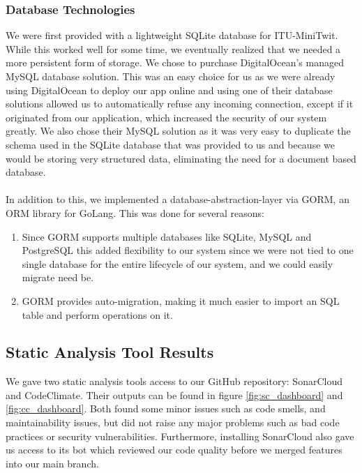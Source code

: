 \documentclass{article}
\begin{document}
\subsubsection{Database Technologies}
We were first provided with a lightweight SQLite database for ITU-MiniTwit. While this worked well for some time, we eventually realized that we needed a more persistent form of storage. We chose to purchase DigitalOcean's managed MySQL database solution. This was an easy choice for us as we were already using DigitalOcean to deploy our app online and using one of their database solutions allowed us to automatically refuse any incoming connection, except if it originated from our application, which increased the security of our system greatly. We also chose their MySQL solution as it was very easy to duplicate the schema used in the SQLite database that was provided to us and because we would be storing very structured data, eliminating the need for a document based database.
\\\\
In addition to this, we implemented a database-abstraction-layer via GORM, an ORM library for GoLang. This was done for several reasons:

\begin{enumerate}
    \item Since GORM supports multiple databases like SQLite, MySQL and PostgreSQL this added flexibility to our system since we were not tied to one single database for the entire lifecycle of our system, and we could easily migrate need be.
    \item GORM provides auto-migration, making it much easier to import an SQL table and perform operations on it. 
\end{enumerate}

\subsection{Static Analysis Tool Results}
We gave two static analysis tools access to our GitHub repository: SonarCloud and CodeClimate. Their outputs can be found in figure \ref{fig:sc_dashboard} and \ref{fig:cc_dashboard}. Both found some minor issues such as code smells, and maintainability issues, but did not raise any major problems such as bad code practices or security vulnerabilities. Furthermore, installing SonarCloud also gave us access to its bot which reviewed our code quality before we merged features into our main branch.
\end{document}
